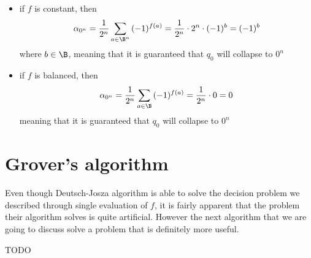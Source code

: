 \documentclass[a4paper, 12pt]{report}
\begin{document}
\begin{itemize}
    \item if $f$ is constant, then $$\alpha_{0^n} = \dfrac{1}{2^n} \sum_{a \in \B^n}{(-1)^{f(a)}} = \dfrac{1}{2^n} \cdot 2^n \cdot (-1)^{b} = (-1)^b$$ where $b \in \B$, meaning that it is guaranteed that $q_0$ will collapse to $0^n$
    \item if $f$ is balanced, then $$\alpha_{0^n} = \dfrac{1}{2^n} \sum_{a \in \B}{(-1)^{f(a)}} = \dfrac{1}{2^n} \cdot 0 = 0$$ meaning that it is guaranteed that $q_0$ will  collapse to $0^n$
\end{itemize}

\section{Grover's algorithm}

Even though Deutsch-Josza algorithm is able to solve the decision problem we described through  single evaluation of $f$, it is fairly apparent that the problem their algorithm solves is quite artificial. However the next algorithm that we are going to discuss solve a problem that is definitely more useful.

TODO 

\printbibliography %
\end{document}
